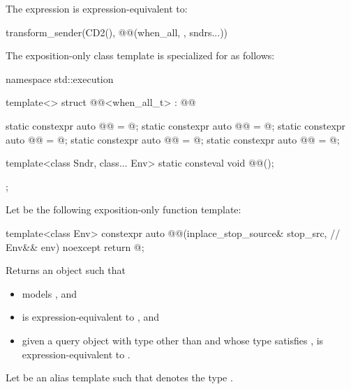 \pnum
The expression  is expression-equivalent to:
\begin{codeblock}
transform_sender(CD2(), @@(when_all, {}, sndrs...))
\end{codeblock}

\pnum
The exposition-only class template 
is specialized for  as follows:
\begin{codeblock}
namespace std::execution {
  template<>
  struct @@<when_all_t> : @@ {
    static constexpr auto @@ = @\seebelow@;
    static constexpr auto @@ = @\seebelow@;
    static constexpr auto @@ = @\seebelow@;
    static constexpr auto @@ = @\seebelow@;
    static constexpr auto @@ = @\seebelow@;

    template<class Sndr, class... Env>
      static consteval void @@();
  };
}
\end{codeblock}

\pnum
Let  be
the following exposition-only function template:
\begin{codeblock}
template<class Env>
  constexpr auto @@(inplace_stop_source& stop_src,               // \expos
                                   Env&& env) noexcept {
  return @\seebelow@;
}
\end{codeblock}
Returns an object  such that
\begin{itemize}
\item
{} models , and
\item
{} is expression-equivalent to
, and
\item
given a query object 
with type other than \cv{}  and
whose type satisfies ,
 is expression-equivalent to .
\end{itemize}

\pnum
Let  be an alias template such that
 denotes the type
.

